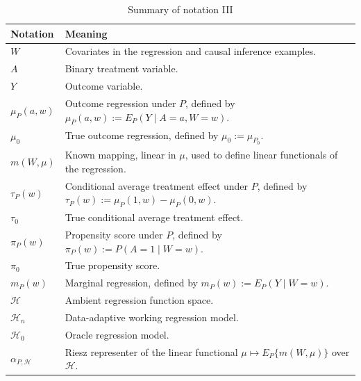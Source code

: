 \documentclass[11pt]{article}
\theoremstyle{definition}
\begin{document}
\begin{table}[H]
\centering
\caption{Summary of notation III}
\label{tab:notation3}
\begin{tabular}{p{}p{}}
\toprule
Notation & Meaning \\
\midrule
\(W\) & Covariates in the regression and causal inference examples. \\

\(A\) & Binary treatment variable. \\

\(Y\) & Outcome variable. \\

\(\mu_P(a,w)\) & Outcome regression under \(P\), defined by \(\mu_P(a,w) := E_P(Y \mid A = a, W = w)\). \\

\(\mu_0\) & True outcome regression, defined by \(\mu_0 := \mu_{P_0}\). \\

\(m(W,\mu)\) & Known mapping, linear in \(\mu\), used to define linear functionals of the regression. \\

\(\tau_P(w)\) & Conditional average treatment effect under \(P\), defined by \(\tau_P(w) := \mu_P(1,w) - \mu_P(0,w)\). \\

\(\tau_0\) & True conditional average treatment effect. \\

\(\pi_P(w)\) & Propensity score under \(P\), defined by \(\pi_P(w) := P(A = 1 \mid W = w)\). \\

\(\pi_0\) & True propensity score. \\

\(m_P(w)\) & Marginal regression, defined by \(m_P(w) := E_P(Y \mid W = w)\). \\

\(\mathcal{H}\) & Ambient regression function space. \\

\(\mathcal{H}_n\) & Data-adaptive working regression model. \\

\(\mathcal{H}_0\) & Oracle regression model. \\

\(\alpha_{P,\mathcal{H}}\) & Riesz representer of the linear functional \(\mu \mapsto E_P\{m(W,\mu)\}\) over \(\mathcal{H}\). \\
\bottomrule
\end{tabular}
\end{table}
\end{document}
